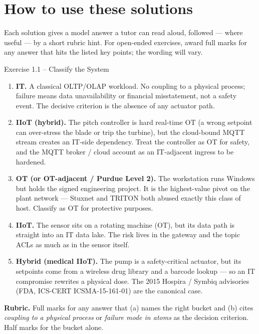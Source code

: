 \documentclass[11pt,a4paper]{article}
\begin{document}
\sheetheader

\section*{How to use these solutions}
Each solution gives a model answer a tutor can read aloud, followed --- where useful --- by a short rubric hint. For open-ended exercises, award full marks for any answer that hits the listed key points; the wording will vary.

\begin{solutionbox}{Exercise 1.1 -- Classify the System}
\begin{enumerate}
  \item \textbf{IT.} A classical OLTP/OLAP workload. No coupling to a physical process; failure means data unavailability or financial misstatement, not a safety event. The decisive criterion is the absence of any actuator path.
  \item \textbf{IIoT (hybrid).} The pitch controller is hard real-time OT (a wrong setpoint can over-stress the blade or trip the turbine), but the cloud-bound MQTT stream creates an IT-side dependency. Treat the controller as OT for safety, and the MQTT broker / cloud account as an IT-adjacent ingress to be hardened.
  \item \textbf{OT (or OT-adjacent / Purdue Level 2).} The workstation runs Windows but holds the signed engineering project. It is the highest-value pivot on the plant network --- Stuxnet and TRITON both abused exactly this class of host. Classify as OT for protective purposes.
  \item \textbf{IIoT.} The sensor sits on a rotating machine (OT), but its data path is straight into an IT data lake. The risk lives in the gateway and the topic ACLs as much as in the sensor itself.
  \item \textbf{Hybrid (medical IIoT).} The pump is a safety-critical actuator, but its setpoints come from a wireless drug library and a barcode lookup --- so an IT compromise rewrites a physical dose. The 2015 Hospira / Symbiq advisories (FDA, ICS-CERT ICSMA-15-161-01) are the canonical case.
\end{enumerate}

\textbf{Rubric.} Full marks for any answer that (a) names the right bucket and (b) cites \emph{coupling to a physical process} or \emph{failure mode in atoms} as the decision criterion. Half marks for the bucket alone.
\end{solutionbox}
\end{document}
